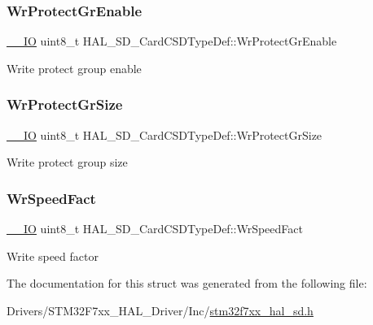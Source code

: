 \subsubsection{\texorpdfstring{WrProtectGrEnable}{WrProtectGrEnable}}
{\footnotesize\ttfamily \mbox{\hyperlink{core__sc300_8h_aec43007d9998a0a0e01faede4133d6be}{\+\_\+\+\_\+\+IO}} uint8\+\_\+t H\+A\+L\+\_\+\+S\+D\+\_\+\+Card\+C\+S\+D\+Type\+Def\+::\+Wr\+Protect\+Gr\+Enable}

Write protect group enable \mbox{\label{struct_h_a_l___s_d___card_c_s_d_type_def_a2b27ac9198754452cadf319422d319f0}} 
\subsubsection{\texorpdfstring{WrProtectGrSize}{WrProtectGrSize}}
{\footnotesize\ttfamily \mbox{\hyperlink{core__sc300_8h_aec43007d9998a0a0e01faede4133d6be}{\+\_\+\+\_\+\+IO}} uint8\+\_\+t H\+A\+L\+\_\+\+S\+D\+\_\+\+Card\+C\+S\+D\+Type\+Def\+::\+Wr\+Protect\+Gr\+Size}

Write protect group size \mbox{\label{struct_h_a_l___s_d___card_c_s_d_type_def_a898a7b4cdea7ec2040a92ee02139d88c}} 
\subsubsection{\texorpdfstring{WrSpeedFact}{WrSpeedFact}}
{\footnotesize\ttfamily \mbox{\hyperlink{core__sc300_8h_aec43007d9998a0a0e01faede4133d6be}{\+\_\+\+\_\+\+IO}} uint8\+\_\+t H\+A\+L\+\_\+\+S\+D\+\_\+\+Card\+C\+S\+D\+Type\+Def\+::\+Wr\+Speed\+Fact}

Write speed factor 

The documentation for this struct was generated from the following file\+:\begin{DoxyCompactItemize}
\item 
Drivers/\+S\+T\+M32\+F7xx\+\_\+\+H\+A\+L\+\_\+\+Driver/\+Inc/\mbox{\hyperlink{stm32f7xx__hal__sd_8h}{stm32f7xx\+\_\+hal\+\_\+sd.\+h}}\end{DoxyCompactItemize}
